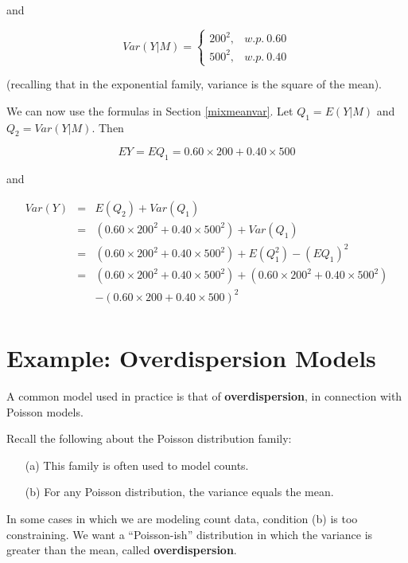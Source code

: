 and 

\begin{equation}
\label{batt2}
Var(Y|M)=\left\{ \begin{array}{rl}
200^2, & w.p. ~ 0.60 \\
500^2, & w.p. ~ 0.40
\end{array}\right. 
\end{equation}

(recalling that in the exponential family, variance is the square of the
mean).

We can now use the formulas in Section \ref{mixmeanvar}.  Let $Q_1 =
E(Y|M)$  and $Q_2 = Var(Y|M)$.  Then

\begin{equation}
EY = EQ_1 = 0.60 \times 200 + 0.40 \times 500
\end{equation}

and 

\begin{eqnarray}
Var(Y) &=& E(Q_2) + Var(Q_1) \\
&=& (0.60 \times 200^2 + 0.40 \times 500^2) + Var(Q_1) \\
&=& (0.60 \times 200^2 + 0.40 \times 500^2) + E(Q_1^2) - (EQ_1)^2 \\
&=& (0.60 \times 200^2 + 0.40 \times 500^2) + (0.60 \times 200^2 + 0.40
\times 500^2)  \\
& & - (0.60 \times 200 + 0.40 \times 500)^2 \\
\end{eqnarray}

\section{Example:  Overdispersion Models}

A common model used in practice is that of {\bf overdispersion}, in
connection with Poisson models.  

Recall the following about the Poisson distribution family:

\begin{itemize}

\item [(a)] This family is often used to model counts.

\item [(b)] For any Poisson distribution, the variance equals the mean.

\end{itemize}

In some cases in which we are modeling count data, condition (b) is too
constraining.  We want a ``Poisson-ish''
distribution in which the variance is greater
than the mean, called {\bf overdispersion}.  

